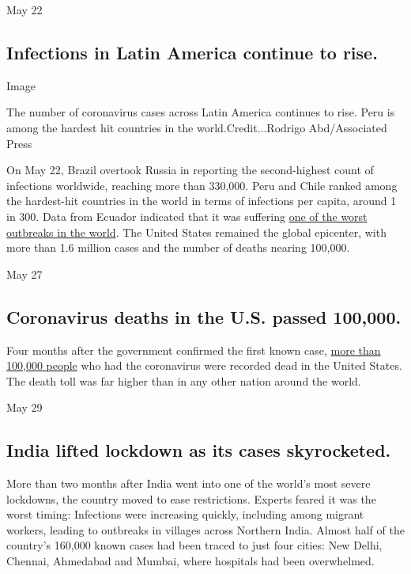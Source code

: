 May 22

\hypertarget{infections-in-latin-america-continue-to-rise}{%
\subsection{Infections in Latin America continue to
rise.}\label{infections-in-latin-america-continue-to-rise}}

Image

The number of coronavirus cases across Latin America continues to rise.
Peru is among the hardest hit countries in the world.Credit...Rodrigo
Abd/Associated Press

On May 22, Brazil overtook Russia in reporting the second-highest count
of infections worldwide, reaching more than 330,000. Peru and Chile
ranked among the hardest-hit countries in the world in terms of
infections per capita, around 1 in 300. Data from Ecuador indicated that
it was suffering
\href{https://www.nytimes3xbfgragh.onion/2020/04/23/world/americas/ecuador-deaths-coronavirus.html}{one
of the worst outbreaks in the world}. The United States remained the
global epicenter, with more than 1.6 million cases and the number of
deaths nearing 100,000.

May 27

\hypertarget{coronavirus-deaths-in-the-us-passed-100000}{%
\subsection{Coronavirus deaths in the U.S. passed
100,000.}\label{coronavirus-deaths-in-the-us-passed-100000}}

Four months after the government confirmed the first known case,
\href{https://www.nytimes3xbfgragh.onion/interactive/2020/05/24/us/us-coronavirus-deaths-100000.html}{more
than 100,000 people} who had the coronavirus were recorded dead in the
United States. The death toll was far higher than in any other nation
around the world.

May 29

\hypertarget{india-lifted-lockdown-as-its-cases-skyrocketed}{%
\subsection{India lifted lockdown as its cases
skyrocketed.}\label{india-lifted-lockdown-as-its-cases-skyrocketed}}

More than two months after India went into one of the world's most
severe lockdowns, the country moved to ease restrictions. Experts feared
it was the worst timing: Infections were increasing quickly, including
among migrant workers, leading to outbreaks in villages across Northern
India. Almost half of the country's 160,000 known cases had been traced
to just four cities: New Delhi, Chennai, Ahmedabad and Mumbai, where
hospitals had been overwhelmed.

